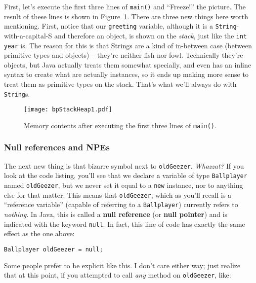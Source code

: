 First, let's execute the first three lines of \texttt{main()} and ``Freeze!''
the picture. The result of these lines is shown in
Figure~\ref{fig:bpStackHeap1}. There are three new things here worth
mentioning. First, notice that our \texttt{greeting} variable, although it is
a \texttt{String}-with-a-capital-S and therefore an object, is shown on the
\textit{stack}, just like the \texttt{int year} is. The reason for this is
that Strings are a kind of in-between case (between primitive types and
objects) -- they're neither fish nor fowl. Technically they're objects, but
Java actually treats them somewhat specially, and even has an inline syntax to
create what are actually instances, so it ends up making more sense to treat
them as primitive types on the stack. That's what we'll always do with
\texttt{String}s.

\begin{figure}   %
\centering
\texttt{[image: bpStackHeap1.pdf]}
\caption{Memory contents after executing the first three lines of
\texttt{main()}.}
\label{fig:bpStackHeap1}
\end{figure}

\subsubsection{Null references and NPEs}

The next new thing is that bizarre symbol next to \texttt{oldGeezer}.
\textit{Whazzat?} If you look at the code listing, you'll see that we
declare a variable of type \texttt{Ballplayer} named \texttt{oldGeezer}, but
we never set it equal to a \texttt{new} instance, nor to anything else for
that matter. This means that \texttt{oldGeezer}, which as you'll recall is a
``reference variable'' (capable of referring to a \texttt{Ballplayer})
currently refers to \textit{nothing}. In Java, this is called a \textbf{null
reference} (or \textbf{null pointer}) and is indicated with the keyword
\texttt{null}. In fact, this line of code has exactly the same effect as the
one above:

\begin{Verbatim}[fontsize=\small,samepage=true]
    Ballplayer oldGeezer = null;
\end{Verbatim}

Some people prefer to be explicit like this. I don't care either way; just
realize that at this point, if you attempted to call \textit{any} method on
\texttt{oldGeezer}, like:


